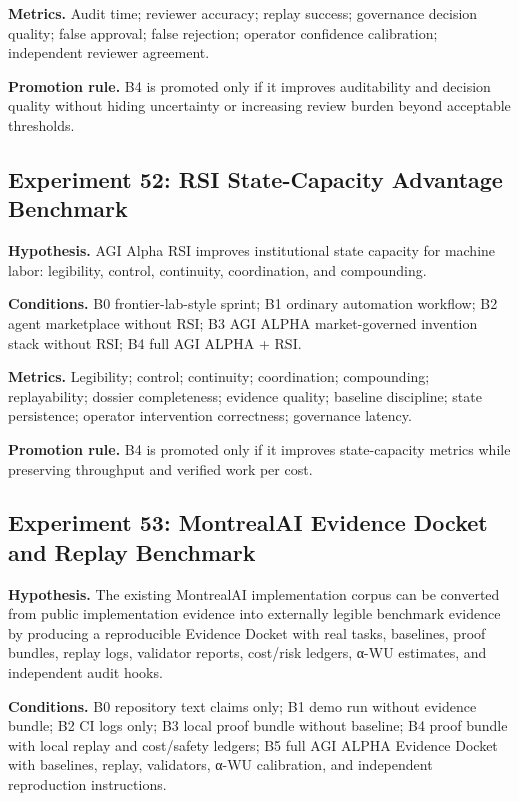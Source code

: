 \documentclass[
  11pt,
]{article}
\begin{document}
\textbf{Metrics.} Audit time; reviewer accuracy; replay success;
governance decision quality; false approval; false rejection; operator
confidence calibration; independent reviewer agreement.

\textbf{Promotion rule.} B4 is promoted only if it improves auditability
and decision quality without hiding uncertainty or increasing review
burden beyond acceptable thresholds.

\subsection{Experiment 52: RSI State-Capacity Advantage
Benchmark}\label{experiment-52-rsi-state-capacity-advantage-benchmark}

\textbf{Hypothesis.} AGI Alpha RSI improves institutional state capacity
for machine labor: legibility, control, continuity, coordination, and
compounding.

\textbf{Conditions.} B0 frontier-lab-style sprint; B1 ordinary
automation workflow; B2 agent marketplace without RSI; B3 AGI ALPHA
market-governed invention stack without RSI; B4 full AGI ALPHA + RSI.

\textbf{Metrics.} Legibility; control; continuity; coordination;
compounding; replayability; dossier completeness; evidence quality;
baseline discipline; state persistence; operator intervention
correctness; governance latency.

\textbf{Promotion rule.} B4 is promoted only if it improves
state-capacity metrics while preserving throughput and verified work per
cost.

\subsection{Experiment 53: MontrealAI Evidence Docket and Replay
Benchmark}\label{experiment-53-montrealai-evidence-docket-and-replay-benchmark}

\textbf{Hypothesis.} The existing MontrealAI implementation corpus can
be converted from public implementation evidence into externally legible
benchmark evidence by producing a reproducible Evidence Docket with real
tasks, baselines, proof bundles, replay logs, validator reports,
cost/risk ledgers, α-WU estimates, and independent audit hooks.

\textbf{Conditions.} B0 repository text claims only; B1 demo run without
evidence bundle; B2 CI logs only; B3 local proof bundle without
baseline; B4 proof bundle with local replay and cost/safety ledgers; B5
full AGI ALPHA Evidence Docket with baselines, replay, validators, α-WU
calibration, and independent reproduction instructions.
\end{document}
